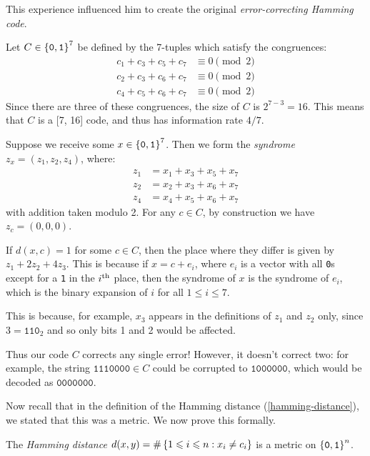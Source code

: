 \documentclass{article}
\begin{document}
This experience influenced him to create the original
\textit{error-correcting Hamming code}.

\begin{example}
	\label{hammings-original-code}
    Let $C \in \left\lbrace \texttt{0}, \texttt{1} \right\rbrace^7$ be defined by the 7-tuples
    which satisfy the congruences:
    \begin{align*}
    	c_1 + c_3 + c_5 + c_7 &\equiv 0 \pmod 2 \\
    	c_2 + c_3 + c_6 + c_7 &\equiv 0 \pmod 2 \\
    	c_4 + c_5 + c_6 + c_7 &\equiv 0 \pmod 2
	\end{align*}
	Since there are three of these congruences,
	the size of $C$ is $2^{7-3} = 16$.
	This means that $C$ is a [7, 16] code,
	and thus has information rate $4/7$.
	
	Suppose we receive some $x \in \left\lbrace \texttt{0}, \texttt{1} \right\rbrace^7$.
	Then we form the \textit{syndrome} $z_x = (z_1, z_2, z_4)$, where:
	\begin{align*}
    	z_1 &= x_1 + x_3 + x_5 + x_7 \\
    	z_2 &= x_2 + x_3 + x_6 + x_7 \\
    	z_4 &= x_4 + x_5 + x_6 + x_7
	\end{align*}
	with addition taken modulo 2.
	For any $c \in C$, by construction we have $z_c = (0, 0, 0)$.
	
	If $d(x, c) = 1$ for some $c \in C$,
	then the place where they differ is given by $z_1 + 2z_2 + 4z_3$.
	This is because if $x = c + e_i$,
	where $e_i$ is a vector with all \texttt{0}s
	except for a \texttt{1} in the $i^{\text{th}}$ place,
	then the syndrome of $x$ is the syndrome of $e_i$,
	which is the binary expansion of $i$ for all $1 \leq i \leq 7$.
	
	This is because, for example,
	$x_3$ appears in the definitions of $z_1$ and $z_2$ only,
	since $3 = \texttt{110}_2$
	and so only bits 1 and 2 would be affected.
	
	Thus our code $C$ corrects any single error!
	However, it doesn't correct two:
	for example, the string $\texttt{1110000} \in C$
	could be corrupted to $\texttt{1000000}$,
	which would be decoded as $\texttt{0000000}$.
\end{example}

Now recall that in the definition of the Hamming distance (\ref{hamming-distance}),
we stated that this was a metric. We now prove this formally.

\begin{proposition}
    The \textit{Hamming distance}
    $d(x, y) = \#\left\lbrace 1 \leqslant i \leqslant n : x_i \neq c_i \right\rbrace$
    is a metric on $\left\lbrace \texttt{0}, \texttt{1} \right\rbrace^n$.
\end{proposition}
\end{document}

